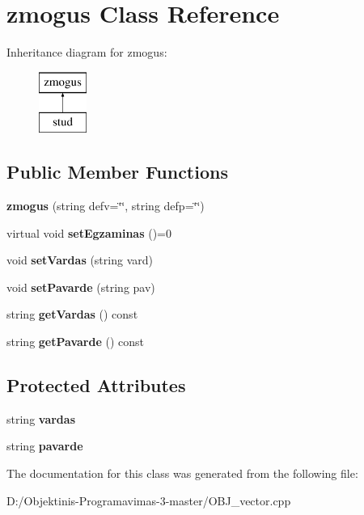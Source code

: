 \hypertarget{classzmogus}{}\section{zmogus Class Reference}
\label{classzmogus}
Inheritance diagram for zmogus\+:\begin{figure}[H]
\begin{center}
\leavevmode
\includegraphics[height=2.000000cm]{classzmogus}
\end{center}
\end{figure}
\subsection*{Public Member Functions}
\begin{DoxyCompactItemize}
\item 
\mbox{\label{classzmogus_afd80e098ec0d5cfd756894a2669afccc}} 
{\bfseries zmogus} (string defv=\char`\"{}\char`\"{}, string defp=\char`\"{}\char`\"{})
\item 
\mbox{\label{classzmogus_a97620844a1bac5dd6afad5bab03c05a1}} 
virtual void {\bfseries set\+Egzaminas} ()=0
\item 
\mbox{\label{classzmogus_ac36580d876003ca5464d258d93c6d0ce}} 
void {\bfseries set\+Vardas} (string vard)
\item 
\mbox{\label{classzmogus_add8a9d931e9f6a66919eccbfb26c6455}} 
void {\bfseries set\+Pavarde} (string pav)
\item 
\mbox{\label{classzmogus_a1c16f5d3a776dd517d3b6c3a2244d49f}} 
string {\bfseries get\+Vardas} () const
\item 
\mbox{\label{classzmogus_a5dfb525146fe08355f3e4aae7357c5da}} 
string {\bfseries get\+Pavarde} () const
\end{DoxyCompactItemize}
\subsection*{Protected Attributes}
\begin{DoxyCompactItemize}
\item 
\mbox{\label{classzmogus_ab79ef7e33cb25ed93458a93f49579d34}} 
string {\bfseries vardas}
\item 
\mbox{\label{classzmogus_ae57250d8b5eec99e78c5bae3a0ab1856}} 
string {\bfseries pavarde}
\end{DoxyCompactItemize}


The documentation for this class was generated from the following file\+:\begin{DoxyCompactItemize}
\item 
D\+:/\+Objektinis-\/\+Programavimas-\/3-\/master/O\+B\+J\+\_\+vector.\+cpp\end{DoxyCompactItemize}
